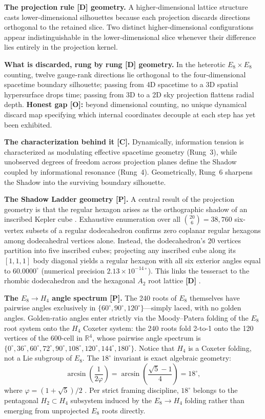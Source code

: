 \documentclass[11pt]{article}
\begin{document}
\noindent\textbf{The projection rule [D] geometry.} A higher-dimensional lattice structure casts lower-dimensional silhouettes because each projection discards directions orthogonal to the retained slice. Two distinct higher-dimensional configurations appear indistinguishable in the lower-dimensional slice whenever their difference lies entirely in the projection kernel.

\noindent\textbf{What is discarded, rung by rung [D] geometry.} In the heterotic $E_8 \times E_8$ counting, twelve gauge-rank directions lie orthogonal to the four-dimensional spacetime boundary silhouette; passing from 4D spacetime to a 3D spatial hypersurface drops time; passing from 3D to a 2D sky projection flattens radial depth. \textbf{Honest gap [O]:} beyond dimensional counting, no unique dynamical discard map specifying which internal coordinates decouple at each step has yet been exhibited.

\noindent\textbf{The characterization behind it [C].} Dynamically, information tension is characterized as modulating effective spacetime geometry (Rung~3), while unobserved degrees of freedom across projection planes define the Shadow coupled by informational resonance (Rung~4). Geometrically, Rung~6 sharpens the Shadow into the surviving boundary silhouette.

\noindent\textbf{The Shadow Ladder geometry [P].} A central result of the projection geometry is that the regular hexagon arises as the orthographic shadow of an inscribed Kepler cube \cite{predictions-paper}. Exhaustive enumeration over all $\binom{20}{6} = 38{,}760$ six-vertex subsets of a regular dodecahedron confirms zero coplanar regular hexagons among dodecahedral vertices alone. Instead, the dodecahedron's 20 vertices partition into five inscribed cubes; projecting any inscribed cube along its $[1,1,1]$ body diagonal yields a regular hexagon with all six exterior angles equal to $60.0000^\circ$ (numerical precision $2.13 \times 10^{-14\circ}$). This links the tesseract to the rhombic dodecahedron and the hexagonal $A_2$ root lattice \textbf{[D]} \cite{predictions-paper}.

\noindent\textbf{The $E_8 \to H_4$ angle spectrum [P].} The 240 roots of $E_8$ themselves have pairwise angles exclusively in $\{60^\circ, 90^\circ, 120^\circ\}$---simply laced, with no golden angles. Golden-ratio angles enter strictly via the Moody--Patera folding \cite{moody-patera} of the $E_8$ root system onto the $H_4$ Coxeter system: the 240 roots fold 2-to-1 onto the 120 vertices of the 600-cell in $\mathbb{R}^4$, whose pairwise angle spectrum is $\{0^\circ, 36^\circ, 60^\circ, 72^\circ, 90^\circ, 108^\circ, 120^\circ, 144^\circ, 180^\circ\}$. Notice that $H_4$ is a Coxeter folding, not a Lie subgroup of $E_8$. The $18^\circ$ invariant is exact algebraic geometry:
\begin{equation}
\label{eq:18deg}
\arcsin\!\left(\frac{1}{2\varphi}\right) = \arcsin\!\left(\frac{\sqrt{5}-1}{4}\right) = 18^\circ,
\end{equation}
where $\varphi = (1+\sqrt{5})/2$ \cite{predictions-paper}. Per strict framing discipline, $18^\circ$ belongs to the pentagonal $H_2 \subset H_4$ subsystem induced by the $E_8 \to H_4$ folding rather than emerging from unprojected $E_8$ roots directly.
\end{document}
